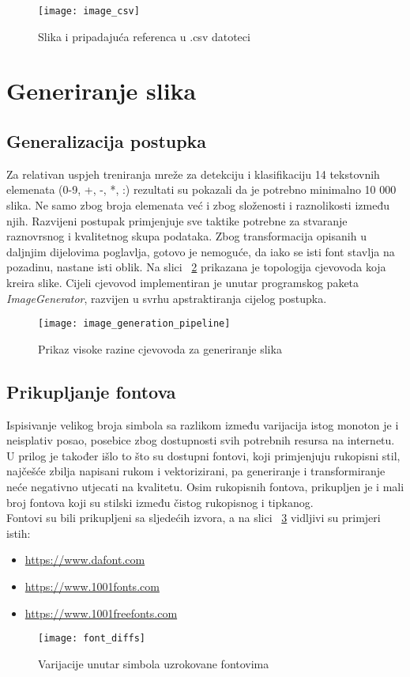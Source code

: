 \begin{figure}[h!]
	\centering
	\texttt{[image: image\_csv]}
	 \caption{Slika i pripadajuća referenca u .csv datoteci}
 	 \label{fig:pipelineExitExample}
\end{figure}

\section{Generiranje slika}
\subsection{Generalizacija postupka}
Za relativan uspjeh treniranja mreže za detekciju i klasifikaciju 14 tekstovnih elemenata (0-9, +, -, *, :) rezultati su pokazali da je potrebno minimalno 10 000 slika. 
Ne samo zbog broja elemenata već i zbog složenosti i raznolikosti između njih. 
Razvijeni postupak primjenjuje sve taktike \cite{chollet2017deep} potrebne za stvaranje raznovrsnog i kvalitetnog skupa podataka.
Zbog transformacija opisanih u daljnjim dijelovima poglavlja, gotovo je nemoguće, da iako se isti font stavlja na pozadinu, nastane isti oblik.
Na slici ~\ref{fig:imageGenerationPipeline} prikazana je topologija cjevovoda koja kreira slike.
Cijeli cjevovod implementiran je unutar programskog paketa \emph{ImageGenerator}, razvijen u svrhu apstraktiranja cijelog postupka.
\begin{figure}[h!]
	\centering
	\texttt{[image: image\_generation\_pipeline]}
	 \caption{Prikaz visoke razine cjevovoda za generiranje slika}
 	 \label{fig:imageGenerationPipeline}
\end{figure}

\subsection{Prikupljanje fontova}
Ispisivanje velikog broja simbola sa razlikom između varijacija istog monoton je i neisplativ posao, posebice zbog dostupnosti svih potrebnih resursa na internetu.
U prilog je također išlo to što su dostupni fontovi, koji primjenjuju rukopisni stil, najčešće zbilja napisani rukom i vektorizirani, pa generiranje i transformiranje neće negativno utjecati na kvalitetu.
Osim rukopisnih fontova, prikupljen je i mali broj fontova koji su stilski između čistog rukopisnog i tipkanog. \\
Fontovi su bili prikupljeni sa sljedećih izvora, a na slici ~\ref{fig:fontDiffs} vidljivi su primjeri istih:
\begin{itemize}
\item \url{https://www.dafont.com}
\item \url{https://www.1001fonts.com}
\item \url{https://www.1001freefonts.com}
\end{itemize}
\begin{figure}[h!]
	\centering
	\texttt{[image: font\_diffs]}
	 \caption{Varijacije unutar simbola uzrokovane fontovima}
 	 \label{fig:fontDiffs}
\end{figure}

